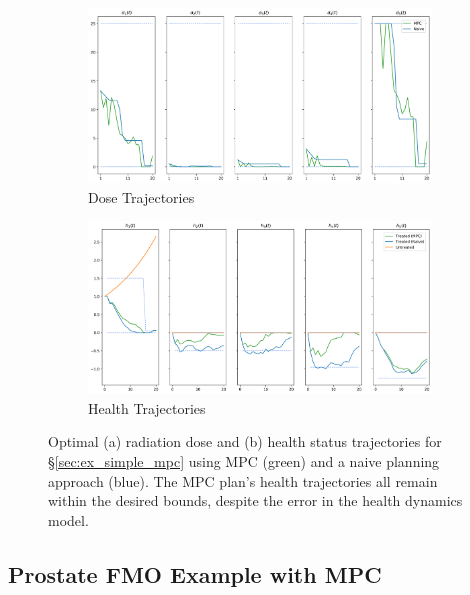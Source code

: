 \documentclass[12pt]{article}
\begin{document}
\begin{figure}
	\begin{center}
		\begin{subfigure}[b]{0.95\textwidth}
			\caption{Dose Trajectories}
			\label{fig:ex2_mpc_traj_dose}
			\includegraphics[width=\textwidth]{figures/ex2_mpc_doses.png}
		\end{subfigure}
		\par\bigskip
		\begin{subfigure}[b]{0.95\textwidth}
			\caption{Health Trajectories}
			\label{fig:ex2_mpc_traj_health}
			\includegraphics[width=\textwidth]{figures/ex2_mpc_health.png}
		\end{subfigure}
		\caption{Optimal (a) radiation dose and (b) health status trajectories for \S\ref{sec:ex_simple_mpc} using MPC (green) and a naive planning approach (blue). The MPC plan's health trajectories all remain within the desired bounds, despite the error in the health dynamics model.}
		\label{fig:ex2_mpc_traj}
	\end{center}
\end{figure}

\subsection{Prostate FMO Example with MPC}
\label{sec:ex_prostate_mpc}
\end{document}
